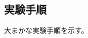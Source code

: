 \documentclass[../../../main]{subfiles}
\begin{document}
    \subsection{実験手順}\label{subsec:method-procedure}

    大まかな実験手順を示す。
\end{document}
